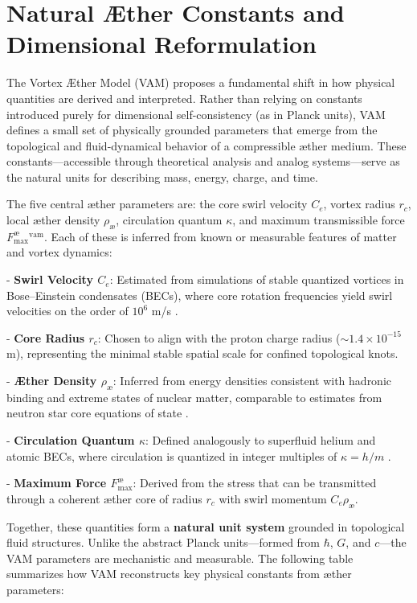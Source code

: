 \section{Natural Æther Constants and Dimensional Reformulation}

The Vortex Æther Model (VAM) proposes a fundamental shift in how physical quantities are derived and interpreted. Rather than relying on constants introduced purely for dimensional self-consistency (as in Planck units), VAM defines a small set of physically grounded parameters that emerge from the topological and fluid-dynamical behavior of a compressible æther medium. These constants—accessible through theoretical analysis and analog systems—serve as the natural units for describing mass, energy, charge, and time.

The five central æther parameters are: the core swirl velocity $C_e$, vortex radius $r_c$, local æther density $\rho_\text{\ae}$, circulation quantum $\kappa$, and maximum transmissible force $F^{\text{\ae}}_{\text{max}}^{\text{vam}}$. Each of these is inferred from known or measurable features of matter and vortex dynamics:

- \textbf{Swirl Velocity $C_e$}: Estimated from simulations of stable quantized vortices in Bose–Einstein condensates (BECs), where core rotation frequencies yield swirl velocities on the order of $10^6$ m/s \cite{Pethick2008BEC, Kleckner2013KnottedVortices}.

- \textbf{Core Radius $r_c$}: Chosen to align with the proton charge radius ($\sim 1.4 \times 10^{-15}$ m), representing the minimal stable spatial scale for confined topological knots.

- \textbf{Æther Density $\rho_\text{\ae}$}: Inferred from energy densities consistent with hadronic binding and extreme states of nuclear matter, comparable to estimates from neutron star core equations of state \cite{Lattimer2016EOS}.

- \textbf{Circulation Quantum $\kappa$}: Defined analogously to superfluid helium and atomic BECs, where circulation is quantized in integer multiples of $\kappa = h/m$ \cite{Donnelly1991QuantizedVortices}.

- \textbf{Maximum Force $F^{\text{\ae}}_{\text{max}}$}: Derived from the stress that can be transmitted through a coherent æther core of radius $r_c$ with swirl momentum $C_e \rho_\text{\ae}$.

Together, these quantities form a \textbf{natural unit system} grounded in topological fluid structures. Unlike the abstract Planck units—formed from $\hbar$, $G$, and $c$—the VAM parameters are mechanistic and measurable. The following table summarizes how VAM reconstructs key physical constants from æther parameters:

